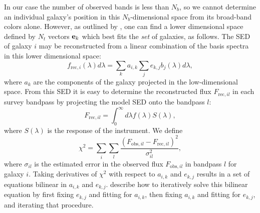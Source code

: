 \documentclass[10pt,preprint]{aastex}
\newcommand{\vv}[1]{{\bf #1}}
\begin{document}
In our case the number of observed bands is less than $N_b$, so we
cannot determine an individual galaxy's position in this
$N_b$-dimensional space from its broad-band colors alone.  However, as
outlined by \citet{csabai00a}, one can find a lower dimensional space
defined by $N_t$ vectors $\vv{e}_k$ which best fits the {\it set} of
galaxies, as follows. The SED of galaxy $i$ may be reconstructed from a
linear combination of the basis spectra in this lower dimensional
space:
\begin{equation}
\label{lincomb}
f_{\mathrm{rec},i}(\lambda) d\lambda = 
\sum_k a_{i,k} \sum_j e_{k,j} b_j(\lambda) d\lambda,
\end{equation}
where $a_k$ are the components of the galaxy projected in the
low-dimensional space. From this SED it is easy to determine the
reconstructed flux
$F_{\mathrm{rec},il}$ in each survey bandpass by projecting
the model SED onto the bandpass $l$: 
\begin{equation}
F_{\mathrm{rec},il} = \int_0^\infty d\lambda f(\lambda) S(\lambda),
\end{equation}
where $S(\lambda)$ is the response of the instrument.  We define
\begin{equation}
\chi^2 = \sum_i \sum_l
\frac{(F_{\mathrm{obs},il}-F_{\mathrm{rec},il})^2}{\sigma_{il}^2},
\end{equation}
where $\sigma_{il}$ is the estimated error in the observed flux
$F_{\mathrm{obs},il}$ in bandpass $l$ for galaxy $i$. Taking
derivatives of $\chi^2$ with respect to $a_{i,k}$ and $e_{k,j}$
results in a set of equations bilinear in $a_{i,k}$ and $e_{k,j}$.
\citet{csabai00a} describe how to iteratively solve this bilinear
equation by first fixing $e_{k,j}$ and fitting for $a_{i,k}$, then
fixing $a_{i,k}$ and fitting for $e_{k,j}$, and iterating that
procedure.

\end{document}
